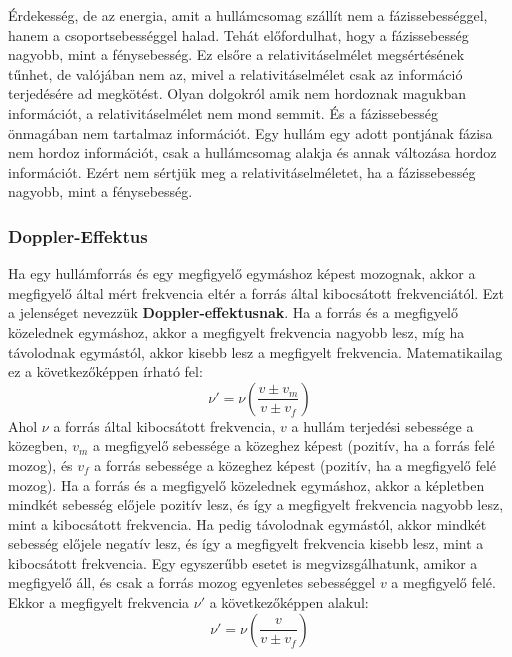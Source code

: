 \documentclass[a4paper,12pt]{article}
\begin{document}
Érdekesség, de az energia, amit a hullámcsomag szállít nem a fázissebességgel, hanem a csoportsebességgel halad. Tehát előfordulhat, hogy a fázissebesség nagyobb, mint a fénysebesség.
Ez elsőre a relativitáselmélet megsértésének tűnhet, de valójában nem az, mivel a relativitáselmélet csak az információ terjedésére ad megkötést. Olyan dolgokról amik nem hordoznak magukban információt, a relativitáselmélet nem mond semmit.
És a fázissebesség önmagában nem tartalmaz információt. Egy hullám egy adott pontjának fázisa nem hordoz információt, csak a hullámcsomag alakja és annak változása hordoz információt.
Ezért nem sértjük meg a relativitáselméletet, ha a fázissebesség nagyobb, mint a fénysebesség.

\subsubsection{Doppler-Effektus}
Ha egy hullámforrás és egy megfigyelő egymáshoz képest mozognak, akkor a megfigyelő által mért frekvencia eltér a forrás által kibocsátott frekvenciától. Ezt a jelenséget nevezzük \textbf{Doppler-effektusnak}.
Ha a forrás és a megfigyelő közelednek egymáshoz, akkor a megfigyelt frekvencia nagyobb lesz, míg ha távolodnak egymástól, akkor kisebb lesz a megfigyelt frekvencia.
Matematikailag ez a következőképpen írható fel: 
\begin{equation}
    \nu' = \nu \left( \frac{v \pm v_{m}}{v \pm v_f} \right)
\end{equation}
Ahol $\nu$ a forrás által kibocsátott frekvencia, $v$ a hullám terjedési sebessége a közegben, $v_m$ a megfigyelő sebessége a közeghez képest (pozitív, ha a forrás felé mozog), és $v_f$ a forrás sebessége a közeghez képest (pozitív, ha a megfigyelő felé mozog).
Ha a forrás és a megfigyelő közelednek egymáshoz, akkor a képletben mindkét sebesség előjele pozitív lesz, és így a megfigyelt frekvencia nagyobb lesz, mint a kibocsátott frekvencia.
Ha pedig távolodnak egymástól, akkor mindkét sebesség előjele negatív lesz, és így a megfigyelt frekvencia kisebb lesz, mint a kibocsátott frekvencia.
Egy egyszerűbb esetet is megvizsgálhatunk, amikor a megfigyelő áll, és csak a forrás mozog egyenletes sebességgel $v$ a megfigyelő felé. Ekkor a megfigyelt frekvencia $\nu'$ a következőképpen alakul:
\begin{equation}
    \nu' = \nu \left( \frac{v}{v \pm v_f} \right)
\end{equation} 
\end{document}
